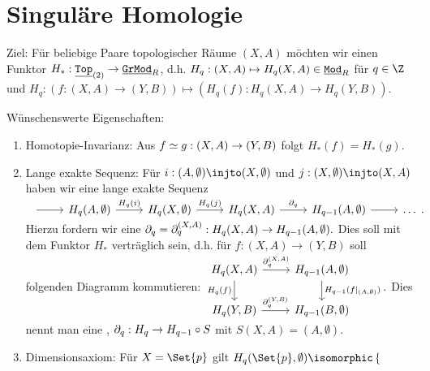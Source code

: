 \chapter{Singuläre Homologie}

Ziel: Für beliebige Paare topologischer Räume $(X, A)$ möchten wir einen Funktor $H_*: \underline{\mathtt{Top}}_{(2)} \to \underline{\mathtt{GrMod}}_R$, d.h. $H_q: (X, A) \mapsto H_q(X,A) \in \underline{\mathtt{Mod}}_R$ für $q \in \Z$ und $H_q: (f:(X, A) \to (Y, B)) \mapsto (H_q(f): H_q(X,A) \to H_q(Y,B))$.

Wünschenswerte Eigenschaften:
\begin{enumerate}[(1)]
    \item
        Homotopie-Invarianz: Aus $f \simeq g: (X, A) \to (Y, B)$ folgt $H_*(f) = H_*(g)$.
    \item
        Lange exakte Sequenz: Für $i: (A, \emptyset) \injto (X, \emptyset)$ und $j: (X, \emptyset) \injto (X, A)$ haben wir eine lange exakte Sequenz
        \begin{math}
            \begin{tikzcd}
                {} \ar[r] & H_q(A,\emptyset) \ar[r,"H_q(i)"] & H_q(X,\emptyset) \ar[r,"H_q(j)"] & H_q(X,A) \ar[r,"\del_q"] & H_{q-1}(A,\emptyset) \ar[r] & \dotsc
            \end{tikzcd}.
        \end{math}
        Hierzu fordern wir eine 
        \begin{math}
            \mathord{\partial}_q = \mathord{\partial}_q^{(X,A)}: H_q(X, A) \to H_{q-1}(A, \emptyset).
        \end{math}
        Dies soll mit dem Funktor $H_*$ verträglich sein, d.h. für $f: (X, A) \to (Y, B)$ soll folgenden Diagramm kommutieren:
        \begin{math}
            \begin{tikzcd}
                H_q(X, A) \ar[r,"\del_q^{(X,A)}"] \ar[d,"H_q(f)"'] & H_{q-1}(A, \emptyset) \ar[d,"H_{q-1}(f|_{(A, \emptyset)})"] \\
                H_q(Y, B) \ar[r,"\del_q^{(Y,B)}"] & H_{q-1}(B, \emptyset)
            \end{tikzcd}.
        \end{math}
        Dies nennt man eine , $\mathord{\partial}_q: H_q \to H_{q-1} \circ S$ mit $S(X, A) = (A, \emptyset)$.
    \item
        Dimensionsaxiom: Für $X = \Set{p}$ gilt
        \begin{math}
            H_q(\Set{p}, \emptyset) \isomorphic \begin{cases}

\end{cases}
\end{math}
\end{enumerate}
